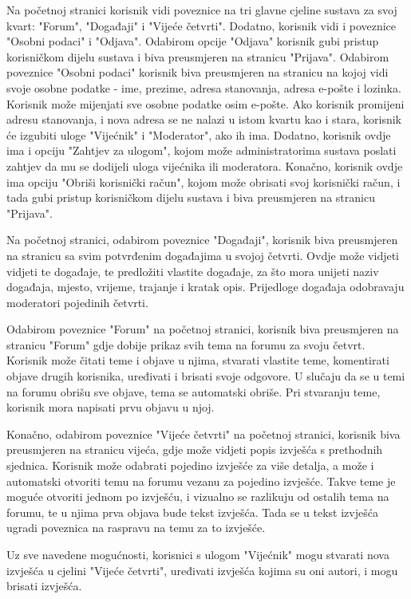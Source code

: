 	Na početnoj stranici korisnik vidi poveznice na tri glavne cjeline sustava za svoj kvart: "Forum", "Događaji" i "Vijeće četvrti". Dodatno, korisnik vidi i poveznice "Osobni podaci" i "Odjava". Odabirom opcije "Odjava" korisnik gubi pristup korisničkom dijelu sustava i biva preusmjeren na stranicu "Prijava". Odabirom poveznice "Osobni podaci" korisnik biva preusmjeren na stranicu na kojoj vidi svoje osobne podatke - ime, prezime, adresa stanovanja, adresa e-pošte i lozinka. Korisnik može mijenjati sve osobne podatke osim e-pošte. Ako korisnik promijeni adresu stanovanja, i nova adresa se ne nalazi u istom kvartu kao i stara, korisnik će izgubiti uloge "Vijećnik" i "Moderator", ako ih ima. Dodatno, korisnik ovdje ima i opciju "Zahtjev za ulogom", kojom može administratorima sustava poslati zahtjev da mu se dodijeli uloga vijećnika ili moderatora. Konačno, korisnik ovdje ima opciju "Obriši korisnički račun", kojom može obrisati svoj korisnički račun, i tada gubi pristup korisničkom dijelu sustava i biva preusmjeren na stranicu "Prijava". 
	
	Na početnoj stranici, odabirom poveznice "Događaji", korisnik biva preusmjeren na stranicu sa svim potvrđenim događajima u svojoj četvrti. Ovdje može vidjeti vidjeti te događaje, te predložiti vlastite događaje, za što mora unijeti naziv događaja, mjesto, vrijeme, trajanje i kratak opis. Prijedloge događaja odobravaju moderatori pojedinih četvrti.
	
	Odabirom poveznice "Forum" na početnoj stranici, korisnik biva preusmjeren na stranicu "Forum" gdje dobije prikaz svih tema na forumu za svoju četvrt. Korisnik može čitati teme i objave u njima, stvarati vlastite teme, komentirati objave drugih korisnika, uređivati i brisati svoje odgovore. U slučaju da se u temi na forumu obrišu sve objave, tema se automatski obriše. Pri stvaranju teme, korisnik mora napisati prvu objavu u njoj.
	
	Konačno, odabirom poveznice "Vijeće četvrti" na početnoj stranici, korisnik biva preusmjeren na stranicu vijeća, gdje može vidjeti popis izvješća s prethodnih sjednica. Korisnik može odabrati pojedino izvješće za više detalja, a može i automatski otvoriti temu na forumu vezanu za pojedino izvješće. Takve teme je moguće otvoriti jednom po izvješću, i vizualno se razlikuju od ostalih tema na forumu, te u njima prva objava bude tekst izvješća. Tada se u tekst izvješća ugradi poveznica na raspravu na temu za to izvješće.
	
	Uz sve navedene mogućnosti, korisnici s ulogom "Vijećnik" mogu stvarati nova izvješća u cjelini "Vijeće četvrti", uređivati izvješća kojima su oni autori, i mogu brisati izvješća.
	
